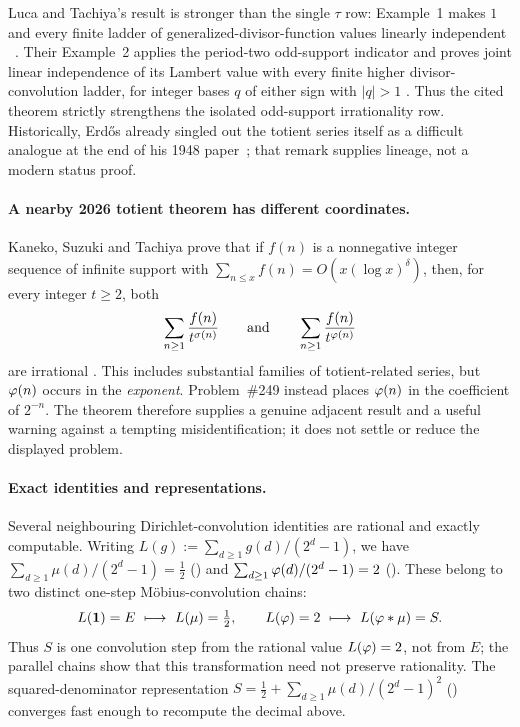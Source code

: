 \documentclass[11pt]{article}
\newcommand{\Stot}{S}
\newcommand{\EB}{E}
\begin{document}
Luca and Tachiya's result is stronger than the single $\tau$ row:
Example~1 makes \(1\) and every finite ladder of generalized-divisor-function
values linearly independent
~\cite[Example~1, p.~140; proof pp.~149--150]{lucatachiya2017}.
Their Example~2 applies the period-two odd-support indicator and proves joint
linear independence of its Lambert value with every finite higher
divisor-convolution ladder, for integer bases \(q\) of either sign with
\(|q|>1\) \cite[Example~2, p.~140]{lucatachiya2017}. Thus the cited theorem
strictly strengthens the isolated odd-support irrationality row.
Historically, Erd\H{o}s already singled out the totient series itself as a
difficult analogue at the end of his 1948 paper~\cite[p.~66]{erdos1948};
that remark supplies lineage, not a modern status proof.

\paragraph{A nearby 2026 totient theorem has different coordinates.}
Kaneko, Suzuki and Tachiya prove that if \(f(n)\) is a nonnegative integer
sequence of infinite support with
\(\sum_{n\le x}f(n)=O(x(\log x)^\delta)\), then, for every integer
\(t\ge2\), both
\[
  \sum_{n\ge1}\frac{f(n)}{t^{\sigma(n)}}
  \qquad\text{and}\qquad
  \sum_{n\ge1}\frac{f(n)}{t^{\varphi(n)}}
\]
are irrational
\cite[Corollary~3, pp.~5--6; proof pp.~18--19]{kanekosuzukitachiya2026}.
This includes substantial families of totient-related series, but
\(\varphi(n)\) occurs in the \emph{exponent}.  Problem~\#249 instead places
\(\varphi(n)\) in the coefficient of \(2^{-n}\).  The theorem therefore supplies
a genuine adjacent result and a useful warning against a tempting
misidentification; it does not settle or reduce the displayed problem.

\paragraph{Exact identities and representations.}
Several neighbouring Dirichlet-convolution identities are rational and
exactly computable.  Writing $L(g):=\sum_{d\ge1}g(d)/(2^d-1)$, we have
$\sum_{d\ge1}\mu(d)/(2^d-1)=\tfrac12$
()
and $\sum_{d\ge1}\varphi(d)/(2^d-1)=2$
().
These belong to two distinct one-step M\"obius-convolution chains:
\[
  L(\mathbf 1)=\EB \ \longmapsto\ L(\mu)=\tfrac12,
  \qquad
  L(\ph)=2 \ \longmapsto\ L(\ph*\mu)=\Stot.
\]
Thus $\Stot$ is one convolution step from the rational value $L(\varphi)=2$, not
from $\EB$; the parallel chains show that this transformation need not
preserve rationality.  The squared-denominator representation
$\Stot=\tfrac12+\sum_{d\ge1}\mu(d)/(2^d-1)^2$
()
converges fast enough to recompute the decimal above.
\end{document}
